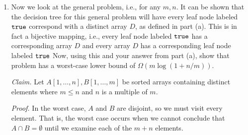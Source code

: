 \begin{enumerate}
\begin{solution}

\end{solution}


	\item Now we look at the general problem, i.e.,
	for any $m,n$. It can be shown that the decision
	tree for this general problem will have every
	leaf node labeled $\mathtt{true}$ correspond with
	a distinct array $D$, as defined in part (a).
	This is in fact a bijective mapping, i.e., every
	leaf node labeled $\mathtt{true}$ has a corresponding array $D$
	and every array $D$ has a corresponding leaf node
	labeled $\mathtt{true}$
	Now, using this and your answer from part (a),
	show that problem has a worst-case lower
	bound of $\Omega(m\log(1+n/m))$.

\begin{solution}\textit{Claim. }Let $A[1,\dots,n],B[1,\dots,m]$ be sorted arrays containing distinct elements where $m\leq n$ and $n$ is a multiple of $m$.

\textit{Proof. }In the worst case, $A$ and $B$ are disjoint, so we must visit every element. That is, the worst case occurs when we cannot conclude that $A\cap B=\emptyset$ until we examine each of the $m+n$ elements.
\end{solution}
\end{enumerate}